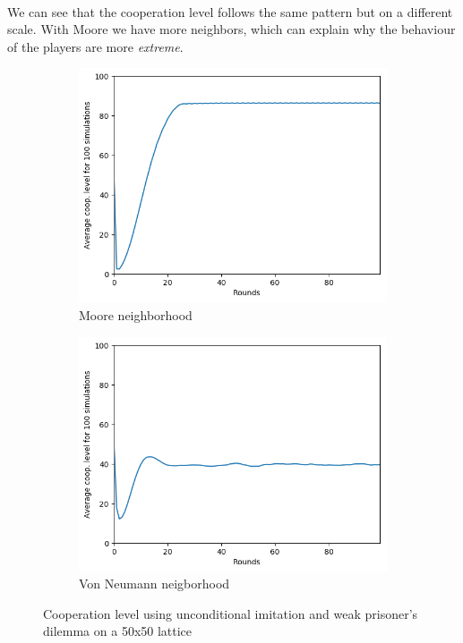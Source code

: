 \documentclass[letterpaper]{article}
\begin{document}
\paragraph{}

We can see that the cooperation level follows the same pattern but on a
different scale. With Moore we have more neighbors, which can explain
why the behaviour of the players are more \textit{extreme}.

\begin{figure}[H]
    \begin{subfigure}{.5\textwidth}
        \centering
        \includegraphics[width=1\linewidth]{images/assign2/50-part1}
        \caption{Moore neighborhood}
        \label{fig:50moorepart1}
    \end{subfigure}
    \begin{subfigure}{.5\textwidth}
        \centering
        \includegraphics[width=1\linewidth]{images/assign2/50_vonneumann-part1}
        \caption{Von Neumann neigborhood}
        \label{fig:50vonpart1}
    \end{subfigure}
    \caption{Cooperation level using unconditional imitation and
    weak prisoner's dilemma on a 50x50 lattice}
    \label{fig:50part1}
\end{figure}
\end{document}
